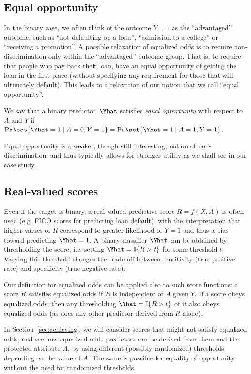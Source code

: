 \subsection{Equal opportunity}
%
In the binary case, we often think of the outcome $Y=1$ as the ``advantaged''
outcome, such as ``not defaulting on a loan'', ``admission to a college'' or
``receiving a promotion''. A possible relaxation of equalized odds 
is to require non-discrimination only within the ``advantaged'' outcome group.
That is, to require that people who pay back their loan, have an equal
opportunity of getting the loan in the first place (without specifying any
requirement for
those that will ultimately default). This leads to a relaxation of our notion
that we call ``equal opportunity''.
%
\begin{definition}
We say that a binary predictor~$\Yhat$ satisfies \emph{equal opportunity}
with respect to $A$ and $Y$ if
$\Pr\set{\Yhat=1\mid A=0, Y=1} = \Pr\set{\Yhat=1\mid A=1, Y=1}\,.$
\end{definition}
%
Equal opportunity is a weaker, though still interesting, notion of
non-discrimination, and thus typically allows for stronger utility as we shall
see in our case study.

\subsection{Real-valued scores}

Even if the target is binary, a real-valued predictive score
$R=f(X,A)$ is often used (e.g. FICO scores for predicting loan
default), with the interpretation that higher values of $R$ correspond
to greater likelihood of $Y=1$ and thus a bias toward predicting
$\Yhat=1$.  A binary classifier $\Yhat$ can be obtained by
thresholding the score, i.e. setting $\Yhat=\mathbb{I}\{R>t\}$ for
some threshold $t$.  Varying this threshold changes the trade-off
between sensitivity (true positive rate) and specificity (true negative rate).

Our definition for equalized odds can be applied also to such score
functions: a score $R$ satisfies equalized odds if $R$ is independent
of $A$ given $Y$.  If a score obeys equalized odds, then any
thresholding $\Yhat=\mathbb{I}\{R>t\}$ of it also obeys equalized odds
(as does any other predictor derived from $R$ alone).  

In Section~\ref{sec:achieving}, we will consider scores that might not satisfy
equalized odds, and see how equalized odds predictors can be derived
from them and the protected attribute $A$, by using different
(possibly randomized) thresholds depending on the value of $A$. 
The same is possible for equality of opportunity without the need for 
randomized thresholds.

